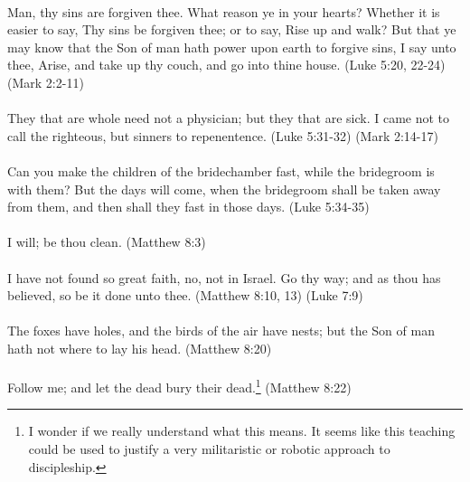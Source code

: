 \paragraph{} Man, thy sins are forgiven thee. What reason ye in your hearts? Whether it is easier to say, Thy sins be forgiven thee; or to say, Rise up and walk? But that ye may know that the Son of man hath power upon earth to forgive sins, I say unto thee, Arise, and take up thy couch, and go into thine house. (Luke 5:20, 22-24) (Mark 2:2-11)

\paragraph{} They that are whole need not a physician; but they that are sick. I came not to call the righteous, but sinners to repenentence. (Luke 5:31-32) (Mark 2:14-17)

\paragraph{} Can you make the children of the bridechamber fast, while the bridegroom is with them? But the days will come, when the bridegroom shall be taken away from them, and then shall they fast in those days. (Luke 5:34-35)

\paragraph{} I will; be thou clean. (Matthew 8:3) 

\paragraph{} I have not found so great faith, no, not in Israel. Go thy way; and as thou has believed, so be it done unto thee. (Matthew 8:10, 13) (Luke 7:9) 

\paragraph{} The foxes have holes, and the birds of the air have nests; but the Son of man hath not where to lay his head. (Matthew 8:20) 

\paragraph{} Follow me; and let the dead bury their dead.\footnote{I wonder if we really understand what this means. It seems like this teaching could be used to justify a very militaristic or robotic approach to discipleship.} (Matthew 8:22) 

